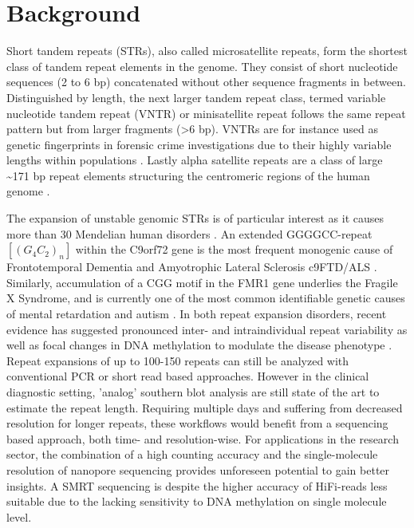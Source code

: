 \section{Background}
\label{sec:strique:background}

Short tandem repeats (STRs), also called microsatellite repeats, form the shortest class of tandem repeat elements in the genome. They consist of short nucleotide sequences (2 to 6 bp) concatenated without other sequence fragments in between. Distinguished by length, the next larger tandem repeat class, termed variable nucleotide tandem repeat (VNTR) or minisatellite repeat follows the same repeat pattern but from larger fragments (>6 bp). VNTRs are for instance used as genetic fingerprints in forensic crime investigations due to their highly variable lengths within populations \cite{Marwal2014}. Lastly alpha satellite repeats are a class of large {\textasciitilde171 bp} repeat elements structuring the centromeric regions of the human genome \cite{McNulty2018}.

The expansion of unstable genomic STRs is of particular interest as it causes more than 30 Mendelian human disorders \cite{Gatchel2005}. An extended GGGGCC-repeat $ [(G_{4}C_{2})_{n}] $ within the C9orf72 gene is the most frequent monogenic cause of Frontotemporal Dementia and Amyotrophic Lateral Sclerosis c9FTD/ALS \cite{Paulson2018}. Similarly, accumulation of a CGG motif in the FMR1 gene underlies the Fragile X Syndrome, and is currently one of the most common identifiable genetic causes of mental retardation and autism \cite{Verkerk1991}. In both repeat expansion disorders, recent evidence has suggested pronounced inter- and intraindividual repeat variability as well as focal changes in DNA methylation to modulate the disease phenotype \cite{Blitterswijk2013, Xi2013, Russ2015}. Repeat expansions of up to 100-150 repeats can still be analyzed with conventional PCR or short read based approaches. However in the clinical diagnostic setting, 'analog' southern blot analysis are still state of the art to estimate the repeat length. Requiring multiple days and suffering from decreased resolution for longer repeats, these workflows would benefit from a sequencing based approach, both time- and resolution-wise. For applications in the research sector, the combination of a high counting accuracy and the single-molecule resolution of nanopore sequencing provides unforeseen potential to gain better insights. A SMRT sequencing is despite the higher accuracy of HiFi-reads less suitable due to the lacking sensitivity to DNA methylation on single molecule level.

